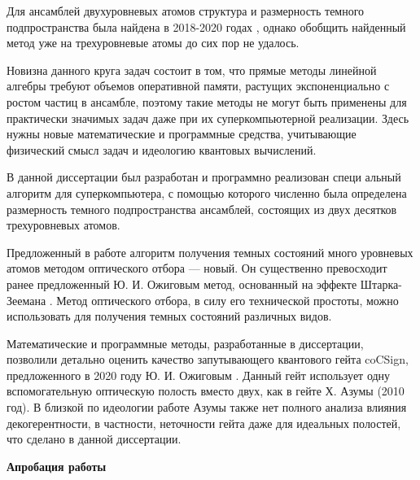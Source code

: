 Для ансамблей двухуровневых атомов структура и размерность темного подпространства была найдена в 2018-2020 годах \cite{dark_states_dimension}, однако обобщить найден­ный метод уже на трехуровневые атомы до сих пор не удалось.

Новизна данного круга задач состоит в том, что прямые методы линейной алгебры требуют объемов оперативной памяти, растущих экспоненциально с ростом частиц в ансамбле, поэтому такие методы не могут быть применены для практически значимых задач даже при их суперкомпьютерной реализации. Здесь нужны новые математические и программные средства, учитывающие физический смысл задач и идеологию квантовых вычислений.

В данной диссертации был разработан и программно реализован специ­ альный алгоритм для суперкомпьютера, с помощью которого численно была определена размерность темного подпространства ансамблей, состоящих из двух десятков трехуровневых атомов.

Предложенный в работе алгоритм получения темных состояний много­ уровневых атомов методом оптического отбора --- новый. Он существенно превосходит ранее предложенный Ю. И. Ожиговым метод, основанный на эффекте Штарка-Зеемана \cite{stark,zeeman_1,zeeman_2,zeeman_3}. Метод оптического отбора, в силу его тех­нической простоты, можно использовать для получения темных состояний различных видов.

Математические и программные методы, разработанные в диссерта­ции, позволили детально оценить качество запутывающего квантового гейта coCSign, предложенного в 2020 году Ю. И. Ожиговым \cite{quantum_gates_asynchronous}. Данный гейт ис­пользует одну вспомогательную оптическую полость вместо двух, как в гейте Х. Азумы \cite{azuma} (2010 год). В близкой по идеологии работе Азумы \cite{azuma} также нет полного анализа влияния декогерентности, в частности, неточности гейта даже для идеальных полостей, что сделано в данной диссертации.

\clearpage
\textbf{Апробация работы}

